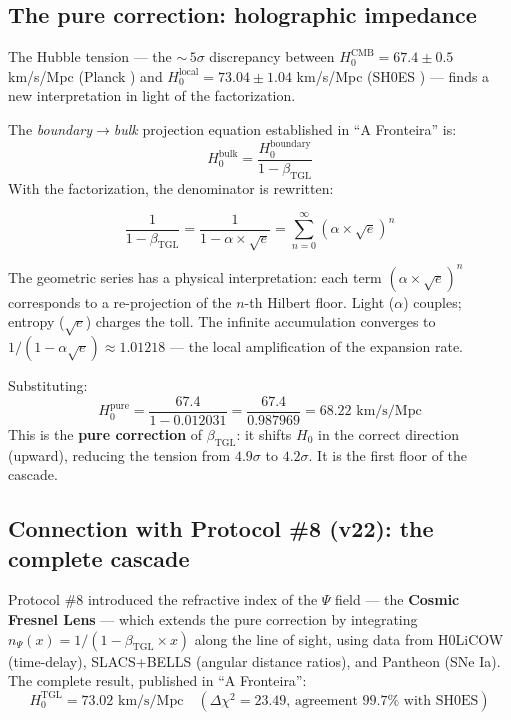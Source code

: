 \documentclass[12pt,a4paper,twoside]{article}
\newcommand{\betatgl}{\beta_{\!\scriptscriptstyle\mathrm{TGL}}}
\newcommand{\boundary}{\textit{boundary}}
\newcommand{\bulk}{\textit{bulk}}
\begin{document}
\subsection{The pure correction: holographic impedance}

The Hubble tension --- the ${\sim}\,5\sigma$ discrepancy between $H_0^{\text{CMB}} = 67.4 \pm 0.5$ km/s/Mpc (Planck \cite{Planck2018}) and $H_0^{\text{local}} = 73.04 \pm 1.04$ km/s/Mpc (SH0ES \cite{Riess2022}) --- finds a new interpretation in light of the factorization.

The \boundary$\to$\bulk{} projection equation established in ``A Fronteira'' \cite{Miguel2026Fronteira} is:
%
\begin{equation}
H_0^{\text{bulk}} = \frac{H_0^{\text{boundary}}}{1 - \betatgl}
\label{eq:hubble_pura}
\end{equation}
%
With the factorization, the denominator is rewritten:
%
\begin{equationbox}[title={Factored holographic impedance}]
\begin{equation}
\frac{1}{1 - \betatgl} = \frac{1}{1 - \alpha \times \sqrt{e}} = \sum_{n=0}^{\infty} (\alpha \times \sqrt{e})^n
\label{eq:impedancia}
\end{equation}
\end{equationbox}
%
The geometric series has a physical interpretation: each term $(\alpha \times \sqrt{e})^n$ corresponds to a re-projection of the $n$-th Hilbert floor. Light ($\alpha$) couples; entropy ($\sqrt{e}$) charges the toll. The infinite accumulation converges to $1/(1 - \alpha\sqrt{e}) \approx 1.01218$ --- the local amplification of the expansion rate.

Substituting:
%
\begin{equation}
H_0^{\text{pure}} = \frac{67.4}{1 - 0.012031} = \frac{67.4}{0.987969} = 68.22 \text{ km/s/Mpc}
\end{equation}
%
This is the \textbf{pure correction} of $\betatgl$: it shifts $H_0$ in the correct direction (upward), reducing the tension from $4.9\sigma$ to $4.2\sigma$. It is the first floor of the cascade.


\subsection{Connection with Protocol \#8 (v22): the complete cascade}
\label{subsec:cascata}

Protocol \#8 \cite{Miguel2026Fronteira} introduced the refractive index of the $\Psi$ field --- the \textbf{Cosmic Fresnel Lens} --- which extends the pure correction by integrating $n_\Psi(x) = 1/(1 - \betatgl \times x)$ along the line of sight, using data from H0LiCOW (time-delay), SLACS+BELLS (angular distance ratios), and Pantheon (SNe Ia). The complete result, published in ``A Fronteira'':
%
\begin{equation}
H_0^{\text{TGL}} = 73.02 \text{ km/s/Mpc} \quad (\Delta\chi^2 = 23.49 \text{, agreement } 99.7\% \text{ with SH0ES})
\end{equation}
\end{document}
